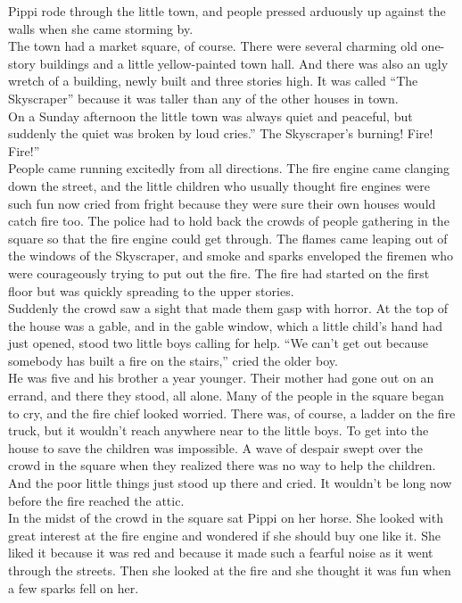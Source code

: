\documentclass{standard}
\begin{document}
Pippi rode through the little town, and people pressed arduously up against the walls when she came storming by.\\

The town had a market square, of course. There were several charming old one- story buildings and a little yellow-painted town hall. And there was also an ugly wretch of a building, newly built and three stories high. It was called “The Skyscraper” because it was taller than any of the other houses in town.\\

On a Sunday afternoon the little town was always quiet and peaceful, but suddenly the quiet was broken by loud cries.” The Skyscraper’s burning! Fire! Fire!”\\

People came running excitedly from all directions. The fire engine came clanging down the street, and the little children who usually thought fire engines were such fun now cried from fright because they were sure their own houses would catch fire too. The police had to hold back the crowds of people gathering in the square so that the fire engine could get through. The flames came leaping out of the windows of the Skyscraper, and smoke and sparks enveloped the firemen who were courageously trying to put out the fire. The fire had started on the first floor but was quickly spreading to the upper stories.\\

Suddenly the crowd saw a sight that made them gasp with horror. At the top of the house was a gable, and in the gable window, which a little child’s hand had just opened, stood two little boys calling for help. “We can’t get out because somebody has built a fire on the stairs,” cried the older boy.\\

He was five and his brother a year younger. Their mother had gone out on an errand, and there they stood, all alone. Many of the people in the square began to cry, and the fire chief looked worried. There was, of course, a ladder on the fire truck, but it wouldn’t reach anywhere near to the little boys. To get into the house to save the children was impossible. A wave of despair swept over the crowd in the square when they realized there was no way to help the children. And the poor little things just stood up there and cried. It wouldn’t be long now before the fire reached the attic.\\

In the midst of the crowd in the square sat Pippi on her horse. She looked with great interest at the fire engine and wondered if she should buy one like it. She liked it because it was red and because it made such a fearful noise as it went through the streets. Then she looked at the fire and she thought it was fun when a few sparks fell on her.\\
\end{document}
